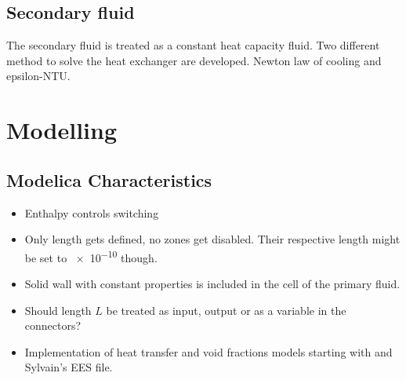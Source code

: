 \documentclass[11pt]{article} %
\begin{document}
\subsection{Secondary fluid}

The secondary fluid is treated as a constant heat capacity fluid. Two different method to solve the heat exchanger are developed. Newton law of cooling and epsilon-NTU.


\section{Modelling}

\subsection{Modelica Characteristics}

\begin{itemize}
\item Enthalpy controls switching
\item Only length gets defined, no zones get disabled. Their respective length might be set to \num{e-10} though. 
\item Solid wall with constant properties is included in the cell of the primary fluid. 
\item Should length $L$ be treated as input, output or as a variable in the connectors?
\item Implementation of heat transfer and void fractions models starting with \cite{Kaern2011b} and Sylvain's EES file.
\end{itemize}






\end{document}
